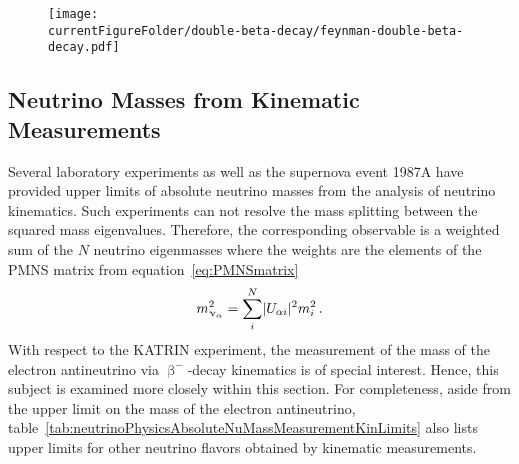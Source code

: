 \begin{figure}[t]
	\centering
	\texttt{[image: \\currentFigureFolder/double-beta-decay/feynman-double-beta-decay.pdf]}
	\label{fig:neutrinoPhysicsAbsoluteNuMassMeasurementDoubleBeta}
\end{figure}

\subsection{Neutrino Masses from Kinematic Measurements}
\label{sec:neutrinoPhysicsAbsoluteNuMassMeasurementKinematics}
Several laboratory experiments as well as the
supernova event 1987A have provided upper limits of absolute neutrino masses from the analysis of neutrino kinematics. Such experiments can not resolve the mass splitting between the squared mass eigenvalues. Therefore, the corresponding observable is a weighted sum of the $N$ neutrino eigenmasses where the weights are the elements of the PMNS matrix from equation~\eqref{eq:PMNSmatrix}~\cite{Otten:2008zz}
\begin{equation}
\label{eq:nuMassSquared}
    m^2_{\upnu_{\alpha}} = \sum_{i}^{N}\lvert U_{\alpha i}\rvert^2 m_i^2 \text{\,.}
\end{equation}
With respect to the KATRIN experiment, the measurement of the mass of the electron antineutrino via $\upbeta^-$-decay kinematics is of special interest. Hence, this subject is examined more closely within this section. For completeness, aside from the upper limit on the mass of the electron antineutrino, table~\ref{tab:neutrinoPhysicsAbsoluteNuMassMeasurementKinLimits} also lists upper limits for other neutrino flavors obtained by kinematic measurements.
